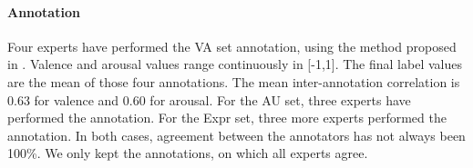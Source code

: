 \documentclass{bmvc2k}
\begin{document}
\begin{table}[h]
\centering
        \caption{Distribution of AU annotations in Aff-Wild2}
    \label{tab:frame_number_action_unit}
\end{table}




\paragraph{Annotation} 
 \vskip-0.3cm
Four experts have performed the VA set annotation, using the method proposed in \cite{cowie2000feeltrace}. Valence and arousal values range continuously in [-1,1]. The final label values are the mean of those four annotations. The mean inter-annotation correlation is 0.63 for valence and 0.60 for arousal. For the AU set, three experts have performed the annotation. For the Expr set, three more experts performed the annotation.  In both cases, agreement between the annotators has not always been 100\%. We only kept the annotations, on which all experts agree. 
\end{document}
